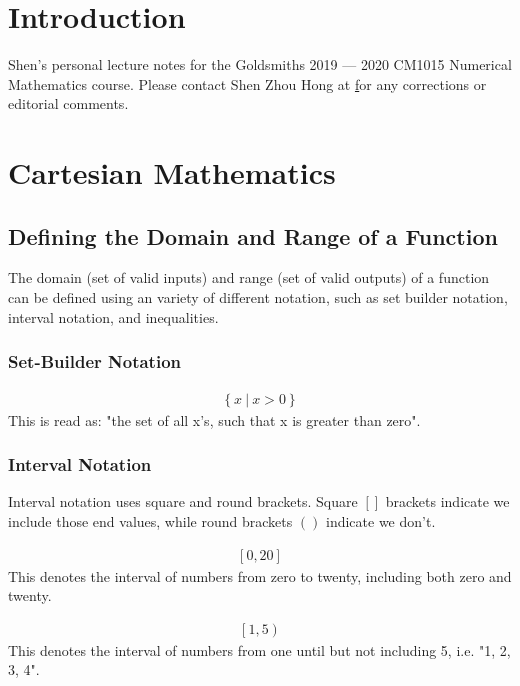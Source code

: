 \section*{Introduction}
Shen's personal lecture notes for the Goldsmiths 2019 --- 2020 CM1015 Numerical Mathematics course. Please contact Shen Zhou Hong at \href{mailto:sh333@student.london.ac.uk} for any corrections or editorial comments.

\section*{Cartesian Mathematics}

\subsection*{Defining the Domain and Range of a Function}
The domain (set of valid inputs) and range (set of valid outputs) of a function can be defined using an variety of different notation, such as set builder notation, interval notation, and inequalities.

\subsubsection*{Set-Builder Notation}
\begin{align*}
  \left\{x\ |\ x > 0\right\}
\end{align*}
\noindent
This is read as: "the set of all x's, such that x is greater than zero".

\subsubsection*{Interval Notation}
Interval notation uses square and round brackets. Square $[]$ brackets indicate we include those end values, while round brackets $()$ indicate we don't.

\begin{align*}
  \left[0, 20\right]
\end{align*}
\noindent
This denotes the interval of numbers from zero to twenty, including both zero and twenty.

\begin{align*}
  \left[1, 5\right)
\end{align*}
\noindent
This denotes the interval of numbers from one until but not including 5, i.e. "1, 2, 3, 4".
